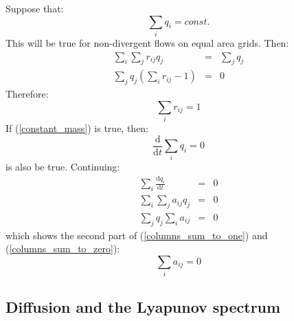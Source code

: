 \documentclass{article}
\begin{document}
\label{mass_conservation_derivation}

Suppose that:
\begin{equation}
	\sum_i q_i = const.
	\label{constant_mass}
\end{equation}
This will be true for non-divergent flows on equal area grids.
Then:
\begin{eqnarray}
	\sum_i \sum_j r_{ij} q_j & = & \sum_j q_j \\
	\sum_j q_j \left ( \sum_i r_{ij} - 1 \right ) & = & 0
\end{eqnarray}
Therefore:
\begin{equation}
	\sum_i r_{ij} = 1
\end{equation}
If (\ref{constant_mass}) is true, then:
\begin{equation}
	\frac{\mathrm d}{\mathrm d t}\sum_i q_i = 0
\end{equation}
is also be true. Continuing:
\begin{eqnarray}
	\sum_i \frac{\mathrm d q_i}{\mathrm d t} & = & 0 \\
\sum_i \sum_j a_{ij} q_j & = & 0 \\
\sum_j q_j \sum_i a_{ij} & = & 0
\end{eqnarray}
which shows the second part of (\ref{columns_sum_to_one}) and 
(\ref{columns_sum_to_zero}):
\begin{equation}
	\sum_i a_{ij} = 0
\end{equation}

\subsection{Diffusion and the Lyapunov spectrum}

\label{Lyapunov_exponents_less_than_zero}
\end{document}
